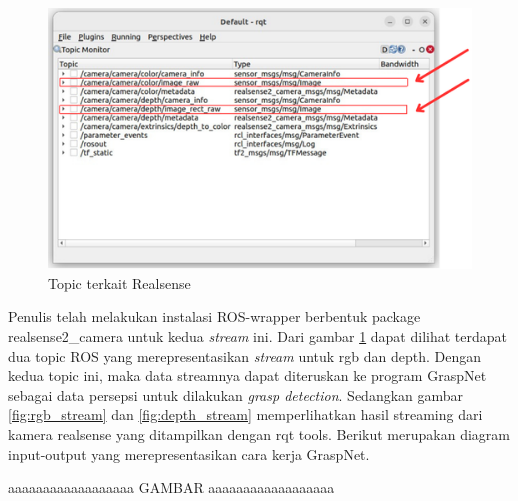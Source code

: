\begin{figure} [H] \centering
    \includegraphics[scale=0.6]{gambar/topic realsense anotated.png}
    \caption{Topic terkait Realsense}
    \label{fig:realsense_topic}
\end{figure}
Penulis telah melakukan instalasi ROS-wrapper berbentuk package realsense2\_camera untuk kedua \emph{stream} ini.
Dari gambar \ref{fig:realsense_topic} dapat dilihat terdapat dua topic ROS yang merepresentasikan \emph{stream} untuk rgb dan depth. Dengan kedua topic ini,
maka data streamnya dapat diteruskan ke program GraspNet sebagai data persepsi untuk dilakukan \emph{grasp detection}. Sedangkan gambar \ref{fig:rgb_stream}
dan \ref{fig:depth_stream} memperlihatkan hasil streaming dari kamera realsense yang ditampilkan dengan rqt tools.
Berikut merupakan diagram input-output yang merepresentasikan cara kerja GraspNet.

aaaaaaaaaaaaaaaaaa GAMBAR aaaaaaaaaaaaaaaaaa

